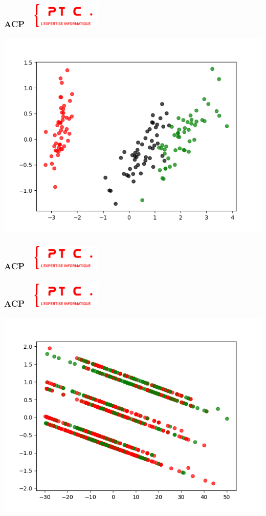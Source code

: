 \documentclass[11pt]{beamer}
\newenvironment{slide}[1]{%
\begin{frame}[environment=slide]
\frametitle{#1~\hfill~\includegraphics[height=1.2cm]{./epitech.png}}
}{%
\end{frame}
}
\newcommand{\Python}[1]{
	{\small	}
}
\begin{document}
\begin{slide}{ACP}
\begin{center}
\includegraphics[scale=0.4]{iris_acp}
\end{center}
\end{slide}

\begin{slide}{ACP}
\begin{center}
\Python{acp}
\end{center}
\end{slide}

\begin{slide}{ACP}
\begin{center}
\includegraphics[scale=0.4]{titanic_acp}
\end{center}
\end{slide}
\end{document}
